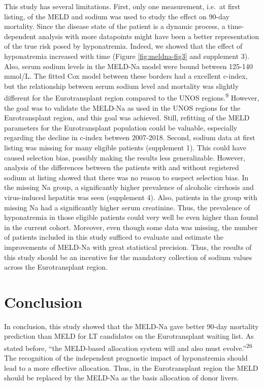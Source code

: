 \documentclass[11pt,english,]{book} %
\begin{document}
This study has several limitations. First, only one measurement, i.e.~at first listing, of the MELD and sodium was used to study the effect on 90-day mortality. Since the disease state of the patient is a dynamic process, a time-dependent analysis with more datapoints might have been a better representation of the true risk posed by hyponatremia. Indeed, we showed that the effect of hyponatremia increased with time (Figure \ref{fig:meldna-fig3} and supplement 3). Also, serum sodium levels in the MELD-Na model were bound between 125-140 mmol/L. The fitted Cox model between these borders had a excellent c-index, but the relationship between serum sodium level and mortality was slightly different for the Eurotransplant region compared to the UNOS regions.\textsuperscript{9} However, the goal was to validate the MELD-Na as used in the UNOS regions for the Eurotransplant region, and this goal was achieved. Still, refitting of the MELD parameters for the Eurotransplant population could be valuable, especially regarding the decline in c-index between 2007-2018. Second, sodium data at first listing was missing for many eligible patients (supplement 1). This could have caused selection bias, possibly making the results less generalizable. However, analysis of the differences between the patients with and without registered sodium at listing showed that there was no reason to suspect selection bias. In the missing Na group, a significantly higher prevalence of alcoholic cirrhosis and virus-induced hepatitis was seen (supplement 4). Also, patients in the group with missing Na had a significantly higher serum creatinine. Thus, the prevalence of hyponatremia in those eligible patients could very well be even higher than found in the current cohort. Moreover, even though some data was missing, the number of patients included in this study sufficed to evaluate and estimate the improvements of MELD-Na with great statistical precision. Thus, the results of this study should be an incentive for the mandatory collection of sodium values across the Eurotransplant region.

\hypertarget{conclusion}{%
\section*{Conclusion}\label{conclusion}}

In conclusion, this study showed that the MELD-Na gave better 90-day mortality prediction than MELD for LT candidates on the Eurotransplant waiting list. As stated before, ``the MELD-based allocation system will and also must evolve.''\textsuperscript{26} The recognition of the independent prognostic impact of hyponatremia should lead to a more effective allocation. Thus, in the Eurotransplant region the MELD should be replaced by the MELD-Na as the basis allocation of donor livers.
\end{document}
